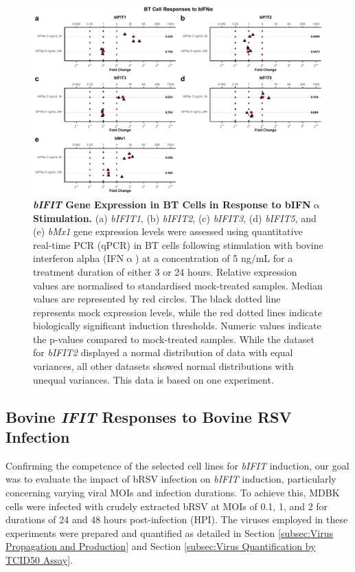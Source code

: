 \begin{figure}
    \centering
    \includegraphics[width=1\linewidth]{07. Chapter 2/Figs/02. Induction/08. bt_bifna.pdf}
    \caption[\textit{bIFIT} Gene Expression in BT Cells in Response to bIFN$\upalpha$ Stimulation.]{\textbf{\textit{bIFIT} Gene Expression in BT Cells in Response to bIFN$\upalpha$ Stimulation.} (a) \textit{bIFIT1}, (b) \textit{bIFIT2}, (c) \textit{bIFIT3}, (d) \textit{bIFIT5}, and (e) \textit{bMx1} gene expression levels were assessed using quantitative real-time PCR (qPCR) in BT cells following stimulation with bovine interferon alpha (IFN$\upalpha$) at a concentration of 5 ng/mL for a treatment duration of either 3 or 24 hours. Relative expression values are normalised to standardised mock-treated samples. Median values are represented by red circles. The black dotted line represents mock expression levels, while the red dotted lines indicate biologically significant induction thresholds. Numeric values indicate the p-values compared to mock-treated samples. While the dataset for \textit{bIFIT2} displayed a normal distribution of data with equal variances, all other datasets showed normal distributions with unequal variances. This data is based on one experiment.}
    \label{fig:BT responses to bifna}
\end{figure}

\subsection{Bovine \textit{IFIT} Responses to Bovine RSV Infection} \label{subsec:Bovine IFITs Responses to Bovine RSV Infection}
Confirming the competence of the selected cell lines for \textit{bIFIT} induction, our goal was to evaluate the impact of bRSV infection on \textit{bIFIT} induction, particularly concerning varying viral MOIs and infection durations. To achieve this, MDBK cells were infected with crudely extracted bRSV at MOIs of 0.1, 1, and 2 for durations of 24 and 48 hours post-infection (HPI). The viruses employed in these experiments were prepared and quantified as detailed in Section \ref{subsec:Virus Propagation and Production} and Section \ref{subsec:Virus Quantification by TCID50 Assay}.

